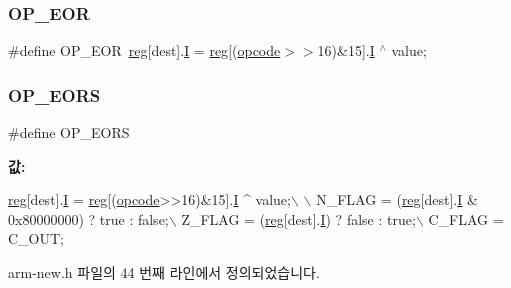 \subsubsection{\texorpdfstring{O\+P\+\_\+\+E\+OR}{OP\_EOR}\hspace{0.1cm}{\footnotesize\ttfamily [2/2]}}
{\footnotesize\ttfamily \#define O\+P\+\_\+\+E\+OR~\mbox{\hyperlink{_globals_8h_ae29faba89509024ffd1a292badcedf2d}{reg}}\mbox{[}dest\mbox{]}.\mbox{\hyperlink{thumb_8h_a782b7c7c9a56a2031f6270eac7f000d6}{I}} = \mbox{\hyperlink{_globals_8h_ae29faba89509024ffd1a292badcedf2d}{reg}}\mbox{[}(\mbox{\hyperlink{thumb_8h_a4fc220098f4b9d0e039a28274d05c198}{opcode}}$>$$>$16)\&15\mbox{]}.\mbox{\hyperlink{thumb_8h_a782b7c7c9a56a2031f6270eac7f000d6}{I}} $^\wedge$ value;}

\mbox{\label{arm-new_8h_ae4b314376e397bf3182aa7def0d7404c}} 
\subsubsection{\texorpdfstring{O\+P\+\_\+\+E\+O\+RS}{OP\_EORS}\hspace{0.1cm}{\footnotesize\ttfamily [1/2]}}
{\footnotesize\ttfamily \#define O\+P\+\_\+\+E\+O\+RS}

{\bfseries 값\+:}
\begin{DoxyCode}
\mbox{\hyperlink{_g_b_a_8h_ae29faba89509024ffd1a292badcedf2d}{reg}}[dest].\mbox{\hyperlink{unionreg__pair_a9f6a42d56c07829d7013571eda998252}{I}} = \mbox{\hyperlink{_g_b_a_8h_ae29faba89509024ffd1a292badcedf2d}{reg}}[(\mbox{\hyperlink{arm-new_8h_a4fc220098f4b9d0e039a28274d05c198}{opcode}}>>16)&15].\mbox{\hyperlink{arm-new_8h_a782b7c7c9a56a2031f6270eac7f000d6}{I}} ^ value;\(\backslash\)
      \(\backslash\)
      N\_FLAG = (\mbox{\hyperlink{_g_b_a_8h_ae29faba89509024ffd1a292badcedf2d}{reg}}[dest].\mbox{\hyperlink{unionreg__pair_a9f6a42d56c07829d7013571eda998252}{I}} & 0x80000000) ? \textcolor{keyword}{true} : \textcolor{keyword}{false};\(\backslash\)
      Z\_FLAG = (\mbox{\hyperlink{_g_b_a_8h_ae29faba89509024ffd1a292badcedf2d}{reg}}[dest].\mbox{\hyperlink{unionreg__pair_a9f6a42d56c07829d7013571eda998252}{I}}) ? \textcolor{keyword}{false} : \textcolor{keyword}{true};\(\backslash\)
      C\_FLAG = C\_OUT;
\end{DoxyCode}


arm-\/new.\+h 파일의 44 번째 라인에서 정의되었습니다.


